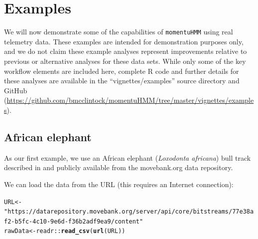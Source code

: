 \documentclass[12pt]{article}\usepackage[]{graphicx}\usepackage[]{xcolor}
\makeatletter
\newcommand{\hlsng}[1]{\textcolor[rgb]{0.192,0.494,0.8}{#1}}%
\newcommand{\hlopt}[1]{\textcolor[rgb]{0,0,0}{#1}}%
\newcommand{\hldef}[1]{\textcolor[rgb]{0.345,0.345,0.345}{#1}}%
\newcommand{\hlkwb}[1]{\textcolor[rgb]{0.69,0.353,0.396}{#1}}%
\newcommand{\hlkwd}[1]{\textcolor[rgb]{0.737,0.353,0.396}{\textbf{#1}}}%
\newenvironment{kframe}{%
 \def\at@end@of@kframe{}%
 \ifinner\ifhmode%
  \def\at@end@of@kframe{\end{minipage}}%
  \begin{minipage}{\columnwidth}%
 \fi\fi%
 \def\FrameCommand##1{\hskip\@totalleftmargin \hskip-\fboxsep
 \colorbox{shadecolor}{##1}\hskip-\fboxsep
     \hskip-\linewidth \hskip-\@totalleftmargin \hskip\columnwidth}%
 \MakeFramed {\advance\hsize-\width
   \@totalleftmargin\z@ \linewidth\hsize
   \@setminipage}}%
 {\par\unskip\endMakeFramed%
 \at@end@of@kframe}
\newenvironment{knitrout}{}{} %
\makeatother
\begin{document}
\section{Examples}
\label{sec:example}
We will now demonstrate some of the capabilities of \verb|momentuHMM| using real telemetry data. These examples are intended for demonstration purposes only, and we do not claim these example analyses represent improvements relative to previous or alternative analyses for these data sets. While only some of the key workflow elements are included here, complete R code and further details for these analyses are available in the ``vignettes/examples'' source directory and GitHub (\url{https://github.com/bmcclintock/momentuHMM/tree/master/vignettes/examples}).


\subsection{African elephant}
\label{sec:elephant}
As our first example, we use an African elephant ({\it Loxodonta africana}) bull track described in \cite{WallEtAl2014} and publicly available from the movebank.org data repository. 

We can load the data from the URL (this requires an Internet connection):
\begin{knitrout}
\color{fgcolor}\begin{kframe}
\begin{alltt}
\hldef{URL} \hlkwb{<-} \hlsng{"https://datarepository.movebank.org/server/api/core/bitstreams/77e38af2-b5fc-4c10-9e6d-f36b2adf9ea9/content"}
\hldef{rawData} \hlkwb{<-} \hldef{readr}\hlopt{::}\hlkwd{read_csv}\hldef{(}\hlkwd{url}\hldef{(URL))}
\end{alltt}


{\ttfamily\noindent\itshape{}}\end{kframe}
\end{knitrout}
\end{document}
